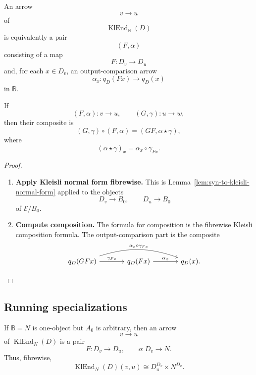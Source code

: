 \begin{theorem}
\label{thm:syn-to-transition-output-normal-form}
    An arrow
    \[
        v\to u
    \]
    of
    \[
        \operatorname{KlEnd}_{\mathbb B}(D)
    \]
    is equivalently a pair
    \[
        (F,\alpha)
    \]
    consisting of a map
    \[
        F:D_v\to D_u
    \]
    and, for each \(x\in D_v\), an output-comparison arrow
    \[
        \alpha_x:q_D(Fx)\to q_D(x)
    \]
    in \(\mathbb B\).

    If
    \[
        (F,\alpha):v\to u,
        \qquad
        (G,\gamma):u\to w,
    \]
    then their composite is
    \[
        (G,\gamma)\circ(F,\alpha)
        =
        (GF,\alpha\star\gamma),
    \]
    where
    \[
        (\alpha\star\gamma)_x
        =
        \alpha_x\circ\gamma_{Fx}.
    \]
\end{theorem}

\begin{proof}
    \leavevmode
    \begin{enumerate}
        \item \textbf{Apply Kleisli normal form fibrewise.}
        This is Lemma~\ref{lem:syn-to-kleisli-normal-form} applied to the
        objects
        \[
            D_v\to B_0,
            \qquad
            D_u\to B_0
        \]
        of \(\mathcal E/B_0\).

        \item \textbf{Compute composition.}
        The formula for composition is the fibrewise Kleisli composition
        formula. The output-comparison part is the composite
        \[
        \begin{tikzcd}[column sep=large, row sep=large]
            q_D(GFx)
                \arrow[r, "{\gamma_{Fx}}"]
                \arrow[rr, bend left=18, "{\alpha_x\circ\gamma_{Fx}}"]
            &
            q_D(Fx)
                \arrow[r, "{\alpha_x}"]
            &
            q_D(x).
        \end{tikzcd}
        \]
    \end{enumerate}
\end{proof}

\subsection{Running specializations}
\label{subsec:syn-to-kleisli-endomorphism-running-specializations}

If \(\mathbb B=N\) is one-object but \(A_0\) is arbitrary, then an arrow
\[
    v\to u
\]
of \(\operatorname{KlEnd}_{N}(D)\) is a pair
\[
    F:D_v\to D_u,
    \qquad
    o:D_v\to N.
\]
Thus, fibrewise,
\[
    \operatorname{KlEnd}_{N}(D)(v,u)
    \cong
    D_u^{D_v}\times N^{D_v}.
\]

